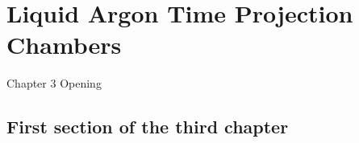 \chapter{Liquid Argon Time Projection Chambers}

\ifpdf
    \graphicspath{{Chapter3/Figs/Raster/}{Chapter3/Figs/PDF/}{Chapter3/Figs/}}
\else
    \graphicspath{{Chapter3/Figs/Vector/}{Chapter3/Figs/}}
\fi


Chapter 3 Opening


\section{First section of the third chapter}
